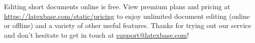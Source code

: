 \documentclass[12pt]{article}
\begin{document}
Editing short documents online is free. View premium plans and pricing at
\url{https://latexbase.com/static/pricing} to enjoy unlimited document editing
(online or offline) and a variety of other useful features. Thanks for trying
out our service and don't hesitate to get in touch at
\href{mailto:support@latexbase.com}{support@latexbase.com}!
\end{document}
